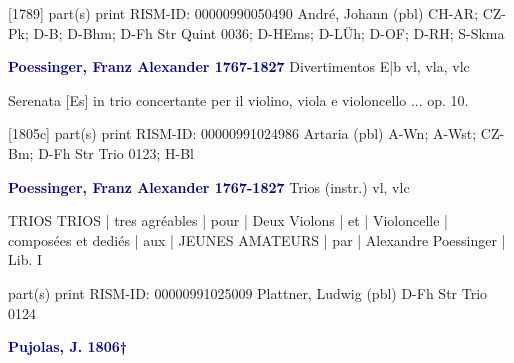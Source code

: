 \documentclass[twocolumn]{book}
\begin{document}
\newline \textcolor{darkblue}{}  [1789]  part(s)  
\newline print
\newline RISM-ID: 00000990050490
\newline André, Johann  (pbl)
\newline CH-AR; CZ-Pk; D-B; D-Bhm; D-Fh  Str Quint 0036; D-HEms; D-LÜh; D-OF; D-RH; S-Skma
\newline \par \vspace{7pt} \textcolor{darkblue}{\textbf{Poessinger, Franz Alexander  1767-1827}}
\newline Divertimentos  E|b  
\newline vl, vla, vlc
\newline \begin{itshape}Serenata [Es] in trio concertante per il violino, viola e violoncello ... op. 10.\end{itshape} 
\newline \textcolor{darkblue}{}  [1805c]  part(s)  
\newline print
\newline RISM-ID: 00000991024986
\newline Artaria  (pbl)
\newline A-Wn; A-Wst; CZ-Bm; D-Fh  Str Trio 0123; H-Bl
\newline \par \vspace{7pt} \textcolor{darkblue}{\textbf{Poessinger, Franz Alexander  1767-1827}}
\newline Trios (instr.)    
 vl, vlc
\newline \begin{itshape}TRIOS TRIOS | tres agréables | pour | Deux Violons | et | Violoncelle | composées et dediés | aux | JEUNES AMATEURS | par | Alexandre Poessinger | Lib. I\end{itshape} 
\newline \textcolor{darkblue}{}  part(s)  
\newline print
\newline RISM-ID: 00000991025009
\newline Plattner, Ludwig  (pbl)
\newline D-Fh  Str Trio 0124
\newline \par \vspace{7pt} \textcolor{darkblue}{\textbf{Pujolas, J.  1806†}}
\end{document}
